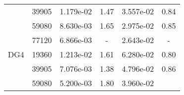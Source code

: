 \begin{table}
\begin{center}
{\begin{tabular}{| l | c | c | c | c | c |}
            &39905
            
                &1.179e-02
                
                &1.47
                
                &3.557e-02
                
                &0.84\\
                
            &59080
            
                &8.630e-03
                
                &1.65
                
                &2.975e-02
                
                &0.85\\
                
            &77120
            
                &6.866e-03
                
                &-
                
                &2.643e-02
                
                &-\\
                \hline
        \hline
        \hspace{0.1cm}DG4\hspace{0.1cm}    
        
            &19360
            
                &1.213e-02
                
                &1.61
                
                &6.280e-02
                
                &0.80\\
                
            &39905
            
                &7.076e-03
                
                &1.38
                
                &4.796e-02
                
                &0.86\\
                
            &59080
            
                &5.200e-03
                
                &1.80
                
                &3.960e-02
                

\end{tabular}}
\end{center}
\end{table}
